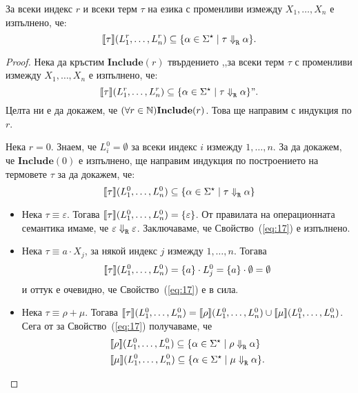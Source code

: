 \begin{lemma}
  За всеки индекс $r$ и всеки терм $\tau$ на езика \REG с променливи измежду $X_1,\dots,X_n$ е изпълнено, че:
  \[\llbracket{\tau}\rrbracket(L^r_1,\dots,L^r_n) \subseteq \{\alpha \in \Sigma^\star \mid \tau \Downarrow^{}_{\texttt{R}} \alpha\}.\]
\end{lemma}
\begin{proof}
  Нека да кръстим $\textbf{Include}(r)$ твърдението
  ,,за всеки терм $\tau$ с променливи измежду $X_1,\dots,X_n$ е изпълнено, че:
  \[\llbracket{\tau}\rrbracket(L^r_1,\dots,L^r_n) \subseteq \{\alpha \in \Sigma^\star \mid \tau \Downarrow^{}_{\texttt{R}} \alpha\}".\]
  Целта ни е да докажем, че $(\forall r\in\mathbb{N})\textbf{Include}(r)$. Това ще направим с индукция по $r$.
  
  Нека $r = 0$. Знаем, че $L^0_i = \emptyset$ за всеки индекс $i$ измежду $1,\dots,n$.
  За да докажем, че $\textbf{Include}(0)$ е изпълнено, ще направим индукция по построението на термовете $\tau$ за да докажем, че:
  \begin{equation}
    \label{eq:17}
    \llbracket{\tau}\rrbracket(L^0_1,\dots,L^0_n) \subseteq \{\alpha \in \Sigma^\star \mid \tau \Downarrow^{}_{\texttt{R}} \alpha\}
  \end{equation}
  \begin{itemize}
  \item
    Нека $\tau \equiv \varepsilon$. Тогава $\llbracket{\tau}\rrbracket(L^0_1,\dots,L^0_n) = \{\varepsilon\}$.
    От правилата на операционната семантика имаме, че $\varepsilon \Downarrow^{}_{\texttt{R}} \varepsilon$.
    Заключаваме, че Свойство~(\ref{eq:17}) е изпълнено.
  \item
    Нека $\tau \equiv a \cdot X_j$, за някой индекс $j$ измежду $1,\dots,n$. Тогава
    \[\llbracket{\tau}\rrbracket(L^0_1,\dots,L^0_n) = \{a\}\cdot L^0_j = \{a\} \cdot \emptyset = \emptyset\]
    и оттук е очевидно, че Свойство~(\ref{eq:17}) е в сила.
  \item
    Нека $\tau \equiv \rho + \mu$. Тогава $\llbracket{\tau}\rrbracket(L^0_1,\dots,L^0_n) = \llbracket{\rho}\rrbracket(L^0_1,\dots,L^0_n) \cup \llbracket{\mu}\rrbracket(L^0_1,\dots,L^0_n)$. Сега от \IndHyp за Свойство~(\ref{eq:17}) получаваме, че
    \begin{align*}
      & \val{\rho}(L^0_1,\dots,L^0_n) \subseteq \{\alpha \in \Sigma^\star \mid \rho \opsem{}{R} \alpha\}\\
      & \val{\mu}(L^0_1,\dots,L^0_n) \subseteq \{\alpha \in \Sigma^\star \mid \mu \opsem{}{R} \alpha\}.

\end{align*}
\end{itemize}
\end{proof}
